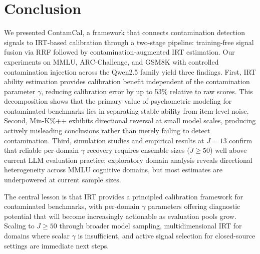 \section{Conclusion}\label{sec:conclusion}

We presented ContamCal, a framework that connects contamination detection signals to IRT-based calibration through a two-stage pipeline: training-free signal fusion via RRF followed by contamination-augmented IRT estimation. Our experiments on MMLU, ARC-Challenge, and GSM8K with controlled contamination injection across the Qwen2.5 family yield three findings. First, IRT ability estimation provides calibration benefit independent of the contamination parameter $\gamma$, reducing calibration error by up to 53\% relative to raw scores. This decomposition shows that the primary value of psychometric modeling for contaminated benchmarks lies in separating stable ability from item-level noise. Second, Min-K\%++ exhibits directional reversal at small model scales, producing actively misleading conclusions rather than merely failing to detect contamination. Third, simulation studies and empirical results at $J = 13$ confirm that reliable per-domain $\gamma$ recovery requires ensemble sizes ($J \geq 50$) well above current LLM evaluation practice; exploratory domain analysis reveals directional heterogeneity across MMLU cognitive domains, but most estimates are underpowered at current sample sizes.

The central lesson is that IRT provides a principled calibration framework for contaminated benchmarks, with per-domain $\gamma$ parameters offering diagnostic potential that will become increasingly actionable as evaluation pools grow. Scaling to $J \geq 50$ through broader model sampling, multidimensional IRT for domains where scalar $\gamma$ is insufficient, and active signal selection for closed-source settings are immediate next steps.